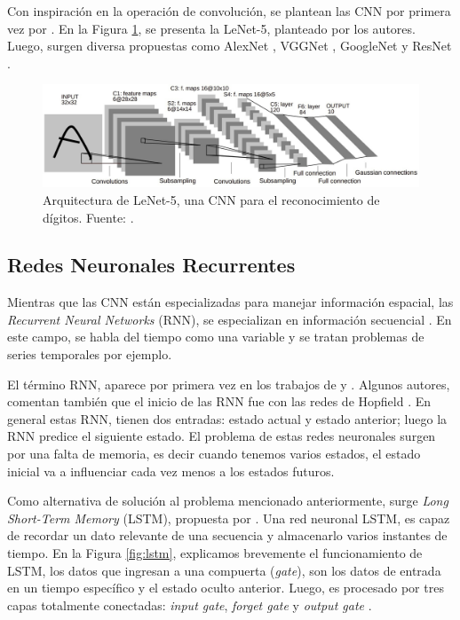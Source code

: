 Con inspiración en la operación de convolución, se plantean las CNN por primera vez por \cite{lecun1998gradient}. En la Figura \ref{fig:cnn3}, se presenta la LeNet-5, planteado por los autores. Luego, surgen diversa propuestas como AlexNet \citep{krizhevsky2012imagenet}, VGGNet \citep{simonyan2014very}, GoogleNet \citep{szegedy2015going} y ResNet \citep{he2016deep}.

\begin{figure}[H]
	\centering
	\includegraphics[width=\textwidth]{../img/neoantigen/cnn3}
	\caption{Arquitectura de LeNet-5, una CNN para el reconocimiento de dígitos. Fuente: \cite{lecun1998gradient}.}
	\label{fig:cnn3}
\end{figure}


\subsection{Redes Neuronales Recurrentes}

Mientras que las CNN están especializadas para manejar información espacial, las \textit{Recurrent Neural Networks} (RNN), se especializan en información secuencial  \citep{zhang2021dive}. En este campo, se habla del tiempo como una variable y se tratan problemas de series temporales por ejemplo.

El término RNN, aparece por primera vez en los trabajos de \cite{rumelhart1985learning} y \cite{jordan1997serial}. Algunos autores, comentan también que el inicio de las RNN fue con las redes de Hopfield  \citep{hopfield1982neural}. En general estas RNN, tienen dos entradas: estado actual y estado anterior; luego la RNN predice el siguiente estado. El problema de estas redes neuronales surgen por una falta de memoria, es decir cuando tenemos varios estados, el estado inicial va a influenciar cada vez menos a los estados futuros.

Como alternativa de solución al problema mencionado anteriormente, surge \textit{Long Short-Term Memory} (LSTM), propuesta por \cite{hochreiter1997long}. Una red neuronal LSTM, es capaz de recordar un dato relevante de una secuencia y almacenarlo varios instantes de tiempo. En la Figura \ref{fig:lstm}, explicamos brevemente el funcionamiento de LSTM, los datos que ingresan a una compuerta (\textit{gate}), son los datos de entrada en un tiempo específico y el estado oculto anterior. Luego, es procesado por tres capas totalmente conectadas: \textit{input gate}, \textit{forget gate} y \textit{output gate} \citep{zhang2021dive}.

